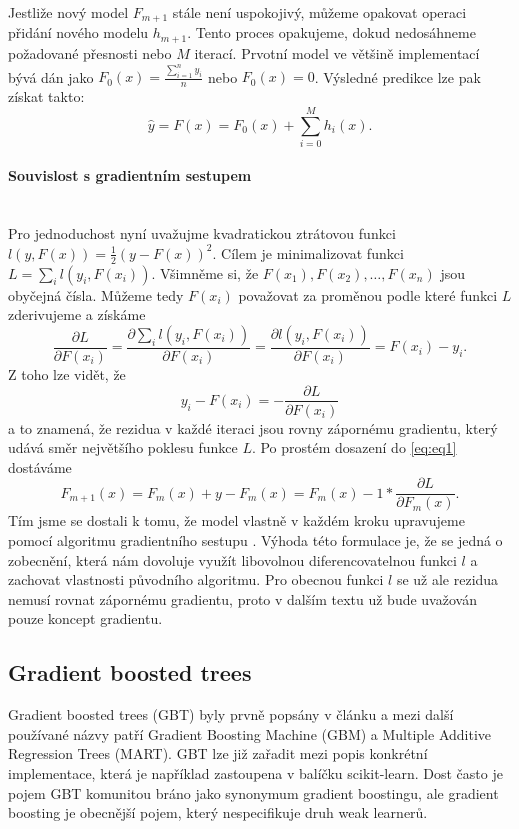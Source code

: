 \documentclass[a4paper]{article}
\begin{document}
Jestliže nový model $F_{m+1}$ stále není uspokojivý, můžeme opakovat operaci přidání nového modelu $h_{m+1}$. Tento proces opakujeme, dokud nedosáhneme požadované přesnosti nebo $M$ iterací. Prvotní model ve většině implementací bývá dán jako $F_{0}(x) = \frac{\sum\limits_{i=1}^n y_i}{n}$ nebo $F_{0}(x)= 0$.  Výsledné predikce lze pak získat takto:
    \begin{equation}
        \hat{y}  = F(x) = F_{0}(x) + \sum \limits_{i=0}^M h_i(x).
    \end{equation} 


\paragraph{Souvislost s gradientním sestupem} \mbox{} \\
Pro jednoduchost nyní uvažujme kvadratickou ztrátovou funkci $l(y, F(x)) = \frac{1}{2}(y - F(x))^2$. Cílem je minimalizovat funkci $L = \sum\nolimits_{i} l(y_i, F(x_i))$. Všimněme si, že $F(x_1), F(x_2), \dots, F(x_n)$ jsou obyčejná čísla. Můžeme tedy $F(x_i)$ považovat za proměnou podle které funkci $L$ zderivujeme a získáme
    \begin{equation}\label{eq:eq4}
        \frac{\partial L}{\partial F(x_i)} = \frac{\partial \sum\nolimits_{i} l(y_i, F(x_i))}{\partial F(x_i)} = \frac{\partial l(y_i, F(x_i))}{\partial F(x_i)} = F(x_i) - y_i. 
    \end{equation} 
Z toho lze vidět, že 
    \begin{equation}
         y_i - F(x_i) = - \frac{\partial L}{\partial F(x_i)}
    \end{equation} 
a to znamená, že rezidua v každé iteraci jsou rovny zápornému gradientu, který udává směr největšího poklesu funkce $L$.
Po prostém dosazení do \eqref{eq:eq1} dostáváme
    \begin{equation}
         F_{m+1}(x) = F_{m}(x) + y - F_m(x)  = F_{m}(x) - 1* \frac{\partial L}{\partial F_m(x)}.
    \end{equation} 
 Tím jsme se dostali k tomu, že model vlastně v každém kroku upravujeme pomocí algoritmu gradientního sestupu \cite{wiki:gradientdescent}. Výhoda této formulace je, že se jedná o zobecnění, která nám dovoluje využít libovolnou diferencovatelnou funkci $l$ a zachovat vlastnosti původního algoritmu. Pro obecnou funkci $l$ se už ale rezidua nemusí rovnat zápornému gradientu, proto v dalším textu už bude uvažován pouze koncept gradientu.

\subsection{Gradient boosted trees}
Gradient boosted trees (GBT) byly prvně popsány v článku \cite{friedman2001greedy} a mezi další používané názvy patří Gradient Boosting Machine (GBM) a Multiple Additive Regression Trees (MART). GBT lze již zařadit mezi popis konkrétní implementace, která je například zastoupena v balíčku scikit-learn. Dost často je pojem GBT komunitou bráno jako synonymum gradient boostingu, ale gradient boosting je obecnější pojem, který nespecifikuje druh weak learnerů.
\end{document}
